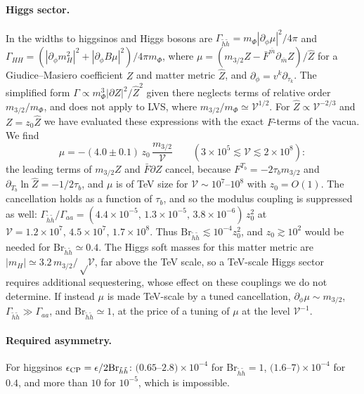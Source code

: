 \documentclass[11pt]{article}
\newcommand{\vol}{\mathcal{V}}
\begin{document}
\paragraph*{Higgs sector.} In \cite{KW} the widths to higgsinos and Higgs bosons are $\Gamma_{\tilde h\tilde h}=m_\Phi|\partial_\phi\mu|^2/4\pi$ and $\Gamma_{HH}=(|\partial_\phi m_H^2|^2+|\partial_\phi B\mu|^2)/4\pi m_\Phi$, where $\mu=(m_{3/2}Z-\bar F^{\bar m}\partial_{\bar m}Z)/\hat Z$ for a Giudice--Masiero coefficient $Z$ and matter metric $\hat Z$, and $\partial_\phi=v^k\partial_{\tau_k}$. The simplified form $\Gamma\propto m_\Phi^3|\partial Z|^2/\hat Z^2$ given there neglects terms of relative order $m_{3/2}/m_\Phi$, and does not apply to LVS, where $m_{3/2}/m_\Phi\simeq\vol^{1/2}$. For $\hat Z\propto\vol^{-2/3}$ and $Z=z_0\hat Z$ we have evaluated these expressions with the exact $F$-terms of the vacua. We find
\begin{equation}
\mu=-(4.0\pm0.1)\,z_0\,\frac{m_{3/2}}{\vol}\qquad(3\times10^5\lesssim\vol\lesssim2\times10^8):
\end{equation}
the leading terms of $m_{3/2}Z$ and $\bar F\partial Z$ cancel, because $F^{T_b}=-2\tau_bm_{3/2}$ and $\partial_{T_b}\ln\hat Z=-1/2\tau_b$, and $\mu$ is of TeV size for $\vol\sim10^7$--$10^8$ with $z_0=O(1)$. The cancellation holds as a function of $\tau_b$, and so the modulus coupling is suppressed as well: $\Gamma_{\tilde h\tilde h}/\Gamma_{aa}=(4.4\times10^{-5},\,1.3\times10^{-5},\,3.8\times10^{-6})\,z_0^2$ at $\vol=1.2\times10^7,\,4.5\times10^7,\,1.7\times10^8$. Thus $\mathrm{Br}_{\tilde h\tilde h}\lesssim10^{-4}z_0^2$, and $z_0\gtrsim10^2$ would be needed for $\mathrm{Br}_{\tilde h\tilde h}\simeq0.4$. The Higgs soft masses for this matter metric are $|m_H|\simeq3.2\,m_{3/2}/\sqrt\vol$, far above the TeV scale, so a TeV-scale Higgs sector requires additional sequestering, whose effect on these couplings we do not determine. If instead $\mu$ is made TeV-scale by a tuned cancellation, $\partial_\phi\mu\sim m_{3/2}$, $\Gamma_{\tilde h\tilde h}\gg\Gamma_{aa}$, and $\mathrm{Br}_{\tilde h\tilde h}\simeq1$, at the price of a tuning of $\mu$ at the level $\vol^{-1}$.

\paragraph*{Required asymmetry.} For higgsinos $\epsilon_{\rm CP}=\epsilon/2\mathrm{Br}_{\tilde h\tilde h}$: $(0.65$--$2.8)\times10^{-4}$ for $\mathrm{Br}_{\tilde h\tilde h}=1$, $(1.6$--$7)\times10^{-4}$ for $0.4$, and more than $10$ for $10^{-5}$, which is impossible.
\end{document}
